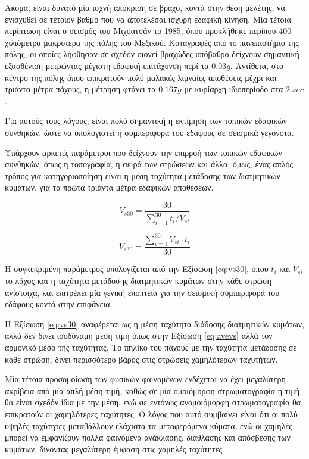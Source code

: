 Ακόμα, είναι δυνατό μία ισχνή απόκριση σε βράχο, κοντά στην θέση μελέτης, να ενισχυθεί σε τέτοιον βαθμό που να αποτελέσαι ισχυρή εδαφική κίνηση. Μία τέτοια περίπτωση είναι ο σεισμός του Μιχοατσάν το 1985, όπου προκλήθηκε περίπου 400 χιλιόμετρα μακρύτερα της πόλης του Μεξικού. Καταγραφές από το πανεπιστήμιο της πόλης, οι οποίες λήφθησαν σε σχεδόν οιονεί βραχώδες υπόβαθρο δείχνουν σημαντική εξασθένιση μετρώντας μέγιστη εδαφική επιτάχυνση περί τα $0.03g$. Αντίθετα, στο κέντρο της πόλης όπου επικρατούν πολύ μαλακές λιμναίες αποθέσεις μέχρι και τριάντα μέτρα πάχους, η μέτρηση φτάνει τα $0.167g$  με κυρίαρχη ιδιοπερίοδο στα $2\;sec$ \parencite{Mex}.

Για αυτούς τους λόγους, είναι πολύ σημαντική η εκτίμηση των τοπικών εδαφικών συνθηκών, ώστε να υπολογιστεί η συμπεριφορά του εδάφους σε σεισμικά γεγονότα.

Υπάρχουν αρκετές παράμετροι που δείχνουν την επιρροή των τοπικών εδαφικών συνθηκών, όπως η τοπογραφία, η σειρά των στρώσεων και άλλα, όμως, ένας απλός τρόπος για κατηγοριοποίηση είναι η μέση ταχύτητα μετάδοσης των διατμητικών κυμάτων, για τα πρώτα τριάντα μέτρα εδαφικών αποθέσεων.

\begin{equation}
	V_{s30} = \dfrac{30}{\sum_{i=1}^{30} t_i/V_{si}}
	\label{eq:vs30}
\end{equation}

\begin{equation}
	V_{s30} = \dfrac{\sum_{i=1}^{30} V_{si} \cdot t_i}{30}
	\label{eq:avevs}
\end{equation}

Η συγκεκριμένη παράμετρος υπολογίζεται από την Εξίσωση \ref{eq:vs30}, όπου $t_i$ και $V_{si}$ το πάχος και η ταχύτητα μετάδοσης διατμητικών κυμάτων στην κάθε στρώση ανίστοιχα, και επιτρέπει μία γενική εποπτεία για την σεισμική συμπεριφορά του εδάφους κοντά στην επιφάνεια.

Η Εξίσωση \ref{eq:vs30} \parencite{NEHRP} αναφέρεται ως η μέση ταχύτητα διάδοσης διατμητικών κυμάτων, αλλά δεν δίνει ισοδύναμη μέση τιμή όπως στην Εξίσωση \ref{eq:avevs} αλλά τον αρμονικό μέσο της ταχύτητας. Το πηλίκο του πάχους με την ταχύτητα μετάδοσης σε κάθε στρώση, δίνει περισσότερο βάρος στις στρώσεις χαμηλότερων ταχυτήτων.

Μία τέτοια προσομοίωση των φυσικών φαινομένων ενδέχεται να έχει μεγαλύτερη ακρίβεια από μία απλή μέση τιμή, καθώς σε μία ομοιόμορφη στρωματογραφία η τιμή θα είναι σχεδόν ίδια με την μέση, ενώ σε εντόνως ανομοιόμορφη στρωματογραφία θα επικρατούν οι χαμηλότερες ταχύτητες. Ο λόγος που αυτό συμβαίνει είναι ότι οι πολύ υψηλές ταχύτητες μεταβάλλουν ελάχιστα τα μεταφερόμενα κύματα, ενώ οι χαμηλές μπορεί να εμφανίζουν πολλά φαινόμενα ανάκλασης, διάθλασης και απόσβεσης των κυμάτων, δίνοντας μεγαλύτερη έμφαση στις χαμηλές ταχύτητες.

